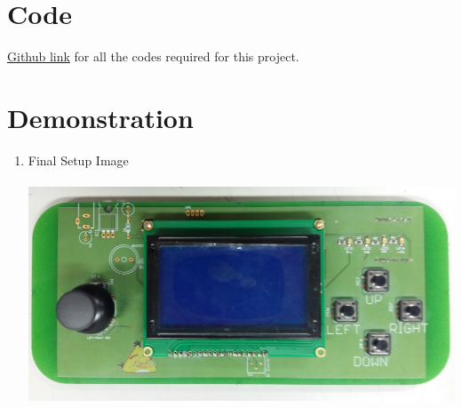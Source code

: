 \documentclass[a4paper,12pt,oneside]{book}
\begin{document}
\section{Code}
\href{https://github.com/eYSIP-2016/eYSIP-2016-Around-the-world-of-Embedded-Systems/tree/origin/master/Solutions/development\%20board}{Github link} for all the codes required for this project.


\section{Demonstration}
\begin{enumerate}
\item Final Setup Image\\~\\
\includegraphics[scale=0.5]{abc.PNG}


\end{enumerate}
\end{document}
